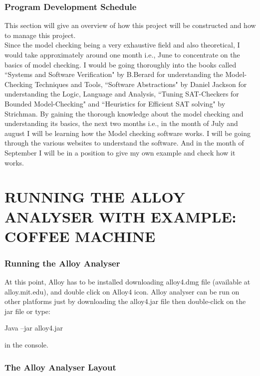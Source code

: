 \documentclass[a4paper,12pt]{extarticle}
\begin{document}
\section{Program Development Schedule}
\label{Prog Schedule}
This section will give an overview of how this project will be constructed and how to manage this project.\\
Since the model checking being a very exhaustive field and also theoretical, I would take approximately around one month i.e., June to concentrate on the basics of model checking. I would be going thoroughly into the books called ``Systems and Software Verification" by B.Berard for understanding the Model-Checking Techniques and Tools, ``Software Abstractions" by Daniel Jackson for understanding the Logic, Language and Analysis, ``Tuning SAT-Checkers for Bounded Model-Checking" and ``Heuristics for Efficient SAT solving" by Strichman.
By gaining the thorough knowledge about the model checking and understanding its basics, the next two months i.e., in the month of July and august I will be learning how the Model checking software works. I will be going through the various websites to understand the software.
And in the month of September I will be in a position to give my own example and check how it works.
\newpage
\part{RUNNING THE ALLOY ANALYSER WITH EXAMPLE: COFFEE MACHINE}
\newpage
\section{Running the Alloy Analyser}
\label{Run Alloy Analyzer}
At this point, Alloy has to be installed downloading alloy4.dmg file (available at alloy.mit.edu), and double click on Alloy4 icon. Alloy analyser can be run on other platforms just by downloading the alloy4.jar file then double-click on the jar file or type:\\
\begin{center}
Java –jar alloy4.jar\\
\end{center}
in the console.
\section{The Alloy Analyser Layout}
\label{Alloy Analyser layout}
\end{document}
